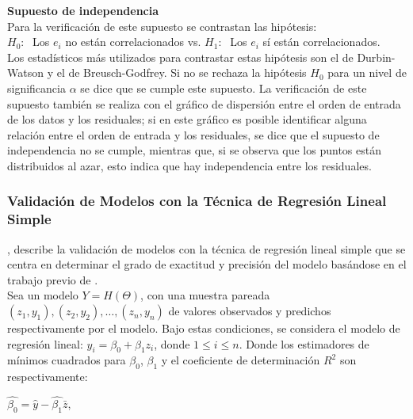 \textbf{Supuesto de independencia}\\

Para la verificación de este supuesto se contrastan las hipótesis:\\

$H_0:\;$ Los $e_i$ no están correlacionados vs. $H_1:\;$ Los $e_i$ sí están correlacionados.\\

Los estadísticos más utilizados para contrastar estas hipótesis son el de Durbin-Watson y el de Breusch-Godfrey. Si no se rechaza la hipótesis $H_0$ para un nivel de significancia $\alpha$ se dice que se cumple este supuesto. La verificación de este supuesto también se realiza con el gráfico de dispersión entre el orden de entrada de los datos y los residuales; si en este gráfico es posible identificar alguna relación entre el orden de entrada y los residuales, se dice que el supuesto de independencia no se cumple, mientras que, si se observa que los puntos están distribuidos al azar, esto indica que hay independencia entre los residuales.






\subsubsection{Validación de Modelos con la Técnica de Regresión Lineal Simple \parencite{febles-2014}}

\textcite{febles-2014}, describe la validación de modelos con la técnica de regresión lineal simple que se centra en determinar el grado de exactitud y precisión del modelo basándose en el trabajo previo de \textcite{balam-2012}.\\

Sea un modelo $Y = H(\Theta )$, con una muestra pareada $(z_{1}, y_{1}), (z_{2}, y_{2}) , \dots , (z_{n}, y_{n})$ de valores observados y predichos respectivamente por el modelo. Bajo estas condiciones, se considera el modelo de regresión lineal: $y_{i}= \beta_{0} + \beta_{1}z_{i}$, donde $ 1 \leq i \leq n$. Donde  los estimadores de mínimos cuadrados para $\beta_{0}$,  $\beta_{1}$ y el coeficiente de determinación $R^{2}$ son respectivamente: \\

\begin{center}
	$\hat{\beta_{0}} = \hat{y} - \hat{\beta_{1}} \bar{z} $, \\
\end{center}

